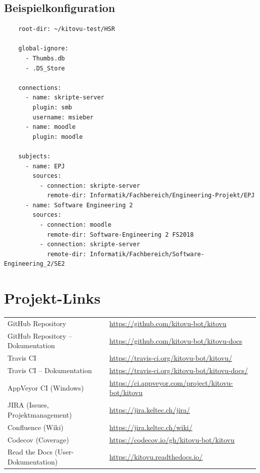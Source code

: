 \documentclass[a4paper]{article}
\let\oldsection\section
\renewcommand\section{\clearpage\oldsection}
\begin{document}
\newpage

\subsection{Beispielkonfiguration}
	\begin{verbatim}
	root-dir: ~/kitovu-test/HSR
	
	global-ignore:
	  - Thumbs.db
	  - .DS_Store
	
	connections:
	  - name: skripte-server
	    plugin: smb
	    username: msieber
	  - name: moodle
	    plugin: moodle
	
	subjects:
	  - name: EPJ
	    sources:
	      - connection: skripte-server
	        remote-dir: Informatik/Fachbereich/Engineering-Projekt/EPJ
	  - name: Software Engineering 2
	    sources:
	      - connection: moodle
	        remote-dir: Software-Engineering 2 FS2018
	      - connection: skripte-server
	        remote-dir: Informatik/Fachbereich/Software-Engineering_2/SE2
	\end{verbatim}

\section{Projekt-Links}
\begin{tabulary}{\linewidth}{ll}
  GitHub Repository & \url{https://github.com/kitovu-bot/kitovu} \\
  GitHub Repository -- Dokumentation & \url{https://github.com/kitovu-bot/kitovu-docs} \\
  Travis CI & \url{https://travis-ci.org/kitovu-bot/kitovu/} \\
  Travis CI -- Dokumentation & \url{https://travis-ci.org/kitovu-bot/kitovu-docs/} \\
  AppVeyor CI (Windows) & \url{https://ci.appveyor.com/project/kitovu-bot/kitovu} \\
  JIRA (Issues, Projektmanagement) & \url{https://jira.keltec.ch/jira/} \\
  Confluence (Wiki) & \url{https://jira.keltec.ch/wiki/} \\
  Codecov (Coverage) & \url{https://codecov.io/gh/kitovu-bot/kitovu} \\
  Read the Docs (User-Dokumentation) & \url{https://kitovu.readthedocs.io/}
\end{tabulary}
\end{document}
